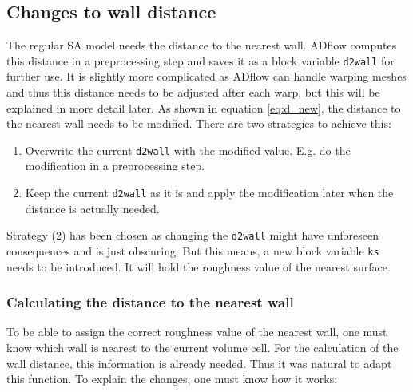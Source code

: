 \subsection{Changes to wall distance}
The regular SA model needs the distance to the nearest wall. ADflow computes
this distance in a preprocessing step and saves it as a block variable
\texttt{d2wall} for further use. It is slightly more complicated as ADflow can
handle warping meshes and thus this distance needs to be adjusted after each
warp, but this will be explained in more detail later. As shown in equation
\ref{eq:d_new}, the distance to the nearest wall needs to be modified. There are
two strategies to achieve this:

\begin{enumerate}
  \item Overwrite the current \texttt{d2wall} with the modified value. E.g. do
        the modification in a preprocessing step.
  \item Keep the current \texttt{d2wall} as it is and apply the modification
        later when the distance is actually needed.
\end{enumerate}

\noindent Strategy (2) has been chosen as changing the \texttt{d2wall} might
have unforeseen consequences and is just obscuring. But this means, a new block
variable \texttt{ks} needs to be introduced. It will hold the roughness value of
the nearest surface.

\subsubsection{Calculating the distance to the nearest wall}
To be able to assign the correct roughness value of the nearest wall, one must
know which wall is nearest to the current volume cell. For the calculation of
the wall distance, this information is already needed. Thus it was natural to
adapt this function. To explain the changes, one must know how it works:

